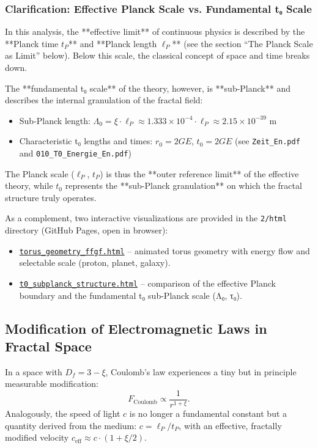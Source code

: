 	\subsubsection{Clarification: Effective Planck Scale vs. Fundamental t₀ Scale}
	In this analysis, the **effective limit** of continuous physics is described by the **Planck time \( t_P \)** and **Planck length \(\ell_P\)** (see the section ``The Planck Scale as Limit'' below). Below this scale, the classical concept of space and time breaks down.
	
	The **fundamental t₀ scale** of the theory, however, is **sub-Planck** and describes the internal granulation of the fractal field:
	\begin{itemize}
		\item Sub-Planck length: \(\Lambda_0 = \xi \cdot \ell_P \approx 1.333 \times 10^{-4} \cdot \ell_P \approx 2.15 \times 10^{-39} \) m
		\item Characteristic t₀ lengths and times: \( r_0 = 2GE \), \( t_0 = 2GE \) (see \texttt{Zeit\_En.pdf} and \texttt{010\_T0\_Energie\_En.pdf})
	\end{itemize}
	
	The Planck scale (\(\ell_P\), \( t_P \)) is thus the **outer reference limit** of the effective theory, while \( t_0 \) represents the **sub-Planck granulation** on which the fractal structure truly operates.
	
	As a complement, two interactive visualizations are provided in the \texttt{2/html} directory (GitHub Pages, open in browser):
	\begin{itemize}
		\item \href{https://jpascher.github.io/T0-Time-Mass-Duality/2/html/torus_geometry_ffgf.html}{\texttt{torus\_geometry\_ffgf.html}} – animated torus geometry with energy flow and selectable scale (proton, planet, galaxy).
		\item \href{https://jpascher.github.io/T0-Time-Mass-Duality/2/html/t0_subplanck_structure.html}{\texttt{t0\_subplanck\_structure.html}} – comparison of the effective Planck boundary and the fundamental t₀ sub-Planck scale (Λ₀, τ₀).
	\end{itemize}
	
	\subsection{Modification of Electromagnetic Laws in Fractal Space}
	In a space with \(D_f = 3-\xi\), Coulomb's law experiences a tiny but in principle measurable modification:
	\begin{equation}
		F_{\text{Coulomb}} \propto \frac{1}{r^{1 + \xi}}.
		\label{eq:fractal_coulomb}
	\end{equation}
	Analogously, the speed of light \(c\) is no longer a fundamental constant but a quantity derived from the medium: \(c = \ell_P / t_P\), with an effective, fractally modified velocity \(c_{\text{eff}} \approx c \cdot (1 + \xi/2)\).
	
